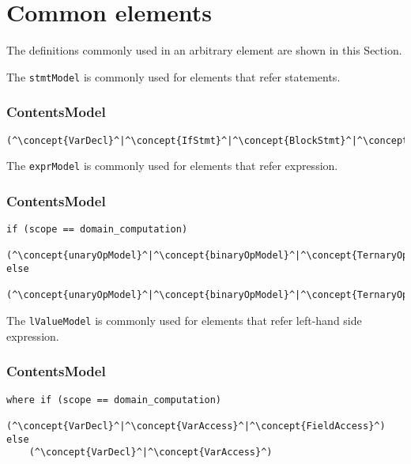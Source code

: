 \section{Common elements}
The definitions commonly used in an arbitrary element are shown in this Section.

The {\tt stmtModel} is commonly used for elements that refer statements.

\subsubsection*{ContentsModel}{}

\begin{lstlisting}[style=default,frame=none]
(^\concept{VarDecl}^|^\concept{IfStmt}^|^\concept{BlockStmt}^|^\concept{Computation}^)
\end{lstlisting}


The {\tt exprModel} is commonly used for elements that refer expression.

\subsubsection*{ContentsModel}{}

\begin{lstlisting}[style=default,frame=none]
if (scope == domain_computation)    
    (^\concept{unaryOpModel}^|^\concept{binaryOpModel}^|^\concept{TernaryOp}^|^\concept{Literal}^|^\concept{FieldAccess}^|^\concept{VarAccess}^|^\concept{FctCall}^|^\irrconcept{NeighbourReduce}^)
else
    (^\concept{unaryOpModel}^|^\concept{binaryOpModel}^|^\concept{TernaryOp}^|^\concept{VarAccess}^|^\concept{Literal}^|^\concept{FctCall}^)
\end{lstlisting}


The {\tt lValueModel} is commonly used for elements that refer left-hand side
expression.

\subsubsection*{ContentsModel}{}

\begin{lstlisting}[style=default,frame=none]
where if (scope == domain_computation)    
    (^\concept{VarDecl}^|^\concept{VarAccess}^|^\concept{FieldAccess}^)
else
    (^\concept{VarDecl}^|^\concept{VarAccess}^)
\end{lstlisting}


